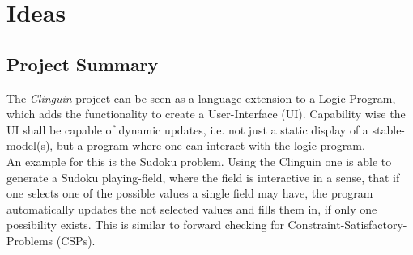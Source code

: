 \documentclass[12pt,a4paper]{article}
\newcommand{\<}[1]{\guilsinglleft}
\renewcommand{\>}[1]{\guilsinglright}
\newcommand{\name}{Alexander Beiser}
\newcommand{\matriculation}{To: The masses}
\begin{document}
\thispagestyle{empty}
\noindent{}
\vspace{0.5cm}





\section{Ideas}

\subsection{Project Summary}

\noindent The \textit{Clinguin} project can be seen as a language extension to a Logic-Program, which adds the functionality to create a User-Interface (UI). Capability wise the UI shall be capable of dynamic updates, i.e. not just a static display of a stable-model(s), but a program where one can interact with the logic program.\\
An example for this is the Sudoku problem. Using the Clinguin one is able to generate a Sudoku playing-field, where the field is interactive in a sense, that if one selects one of the possible values a single field may have, the program automatically updates the not selected values and fills them in, if only one possibility exists. This is similar to forward checking for Constraint-Satisfactory-Problems (CSPs).\\
\end{document}
